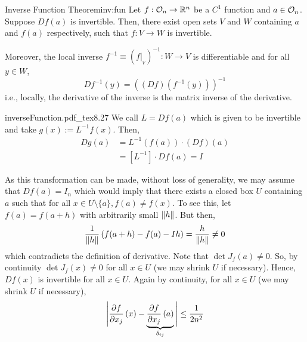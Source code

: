 \documentclass[../Analysis-3.tex]{subfiles}
\begin{document}
\begin{Thm}{Inverse Function Theorem}{inv:fun}
  Let $ f:\mathcal{O}_{n} \to \mathbb{R}^n $ be a $ C^1 $ function and $ a \in \mathcal{O}_{n} $. Suppose $ Df(a) $ is invertible. Then, there exist open sets $ V $ and $ W $ containing $ a $ and $ f(a) $ respectively, such that $ f: V \to W $ is invertible.

  \;

  Moreover, the local inverse $ f^{-1} \equiv \left( f\vert_{{}_V} \right)^{-1} : W \to V $ is differentiable and for all $ y \in W $,
  \[ Df^{-1}(y) = \left( \left( Df \right)\left( f^{-1}(y) \right) \right)^{-1} \]
  i.e., locally, the derivative of the inverse is the matrix inverse of the derivative.
\end{Thm}

\begin{proofFig}{\def\svgwidth{1.4in}
    {inverseFunction.pdf_tex}}{}{\label{fig:inf:fun}}{8}{.27\textwidth}
  We call $ L = Df(a) $ which is given to be invertible and take $ g(x) := L^{-1}f(x) $. Then,
  \begin{align*}
    Dg(a)
     & = L^{-1}(f(a))\cdot (Df)(a)            \\
     & = \left[ L^{-1} \right]\cdot Df(a) = I
  \end{align*}


  As this transformation can be made, without loss of generality, we may assume that $ Df(a) = I_n $ which would imply that there exists a closed box $ U $ containing $ a $ such that for all $ x\in U\setminus\{a\}, f(a) \not= f(x) $. To see this, let $ f(a) = f(a+h) $ with arbitrarily small $ \norm{h} $. But then,
  \[  \frac{1}{\norm{h}}\left( f(a+h)-f(a)-Ih \right) = \frac{h}{\norm{h}} \not= 0  \]
  which contradicts the definition of derivative. Note that $ \det J_f(a) \not= 0 $. So, by continuity $ \det J_f(x) \not= 0 $ for all $ x \in U $ (we may shrink $ U $ if necessary). Hence, $ Df(x) $ is invertible for all $ x \in U $. Again by continuity, for all $ x \in U $ (we may shrink $ U $ if necessary),
  \[  \Bigg\vert \pdv{f}{x_j}\left( x \right) - \underbrace{\pdv{f}{x_j}\left( a \right)}_{\delta_{ij}} \Bigg\vert \leq \frac{1}{2n^2}  \]


\end{proofFig}
\end{document}
